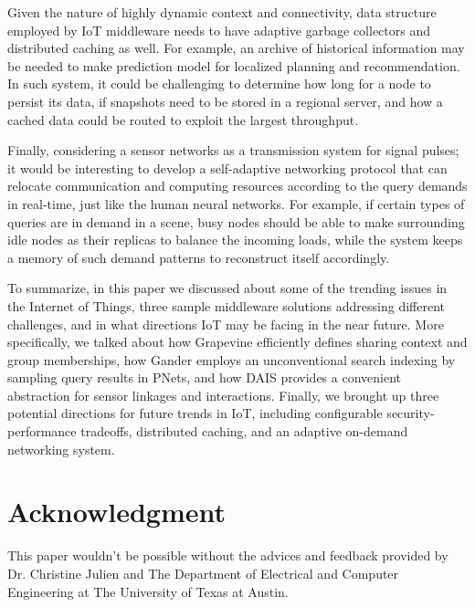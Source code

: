 \documentclass[11pt,onecolumn]{article}
\begin{document}
Given the nature of highly dynamic context and connectivity, data structure employed by IoT middleware needs to have adaptive garbage collectors and distributed caching as well. For example, an archive of historical information may be needed to make prediction model for localized planning and recommendation. In such system, it could be challenging to determine how long for a node to persist its data, if snapshots need to be stored in a regional server, and how a cached data could be routed to exploit the largest throughput.

Finally, considering a sensor networks as a transmission system for signal pulses; it would be interesting to develop a self-adaptive networking protocol that can relocate communication and computing resources according to the query demands in real-time, just like the human neural networks. For example, if certain types of queries are in demand in a scene, busy nodes should be able to make surrounding idle nodes as their replicas to balance the incoming loads, while the system keeps a memory of such demand patterns to reconstruct itself accordingly.


To summarize, in this paper we discussed about some of the trending issues in the Internet of Things, three sample middleware solutions addressing different challenges, and in what directions IoT may be facing in the near future. More specifically, we talked about how Grapevine efficiently defines sharing context and group memberships, how Gander employs an unconventional search indexing by sampling query results in PNets, and how DAIS provides a convenient abstraction for sensor linkages and interactions. Finally, we brought up three potential directions for future trends in IoT, including configurable security-performance tradeoffs, distributed caching, and an adaptive on-demand networking system.

\section*{Acknowledgment}
This paper wouldn't be possible without the advices and feedback provided by Dr. Christine Julien and The Department of Electrical and Computer Engineering at The University of Texas at Austin.



\end{document}
